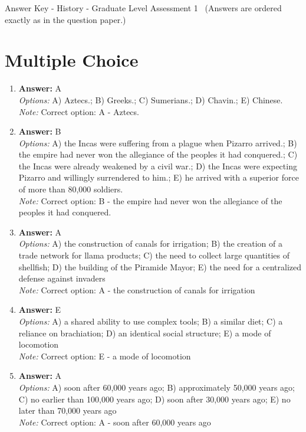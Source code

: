 \documentclass[12pt]{article}
\begin{document}
\begin{center}
Answer Key - History - Graduate Level Assessment 1 \
\small (Answers are ordered exactly as in the question paper.)
\end{center}

\section*{Multiple Choice}
\begin{enumerate}[label=\arabic*.]
\item \textbf{Answer:} A
\\ \textit{Options:} A) Aztecs.; B) Greeks.; C) Sumerians.; D) Chavin.; E) Chinese.
\\ \textit{Note:} Correct option: A - Aztecs.
\item \textbf{Answer:} B
\\ \textit{Options:} A) the Incas were suffering from a plague when Pizarro arrived.; B) the empire had never won the allegiance of the peoples it had conquered.; C) the Incas were already weakened by a civil war.; D) the Incas were expecting Pizarro and willingly surrendered to him.; E) he arrived with a superior force of more than 80,000 soldiers.
\\ \textit{Note:} Correct option: B - the empire had never won the allegiance of the peoples it had conquered.
\item \textbf{Answer:} A
\\ \textit{Options:} A) the construction of canals for irrigation; B) the creation of a trade network for llama products; C) the need to collect large quantities of shellfish; D) the building of the Piramide Mayor; E) the need for a centralized defense against invaders
\\ \textit{Note:} Correct option: A - the construction of canals for irrigation
\item \textbf{Answer:} E
\\ \textit{Options:} A) a shared ability to use complex tools; B) a similar diet; C) a reliance on brachiation; D) an identical social structure; E) a mode of locomotion
\\ \textit{Note:} Correct option: E - a mode of locomotion
\item \textbf{Answer:} A
\\ \textit{Options:} A) soon after 60,000 years ago; B) approximately 50,000 years ago; C) no earlier than 100,000 years ago; D) soon after 30,000 years ago; E) no later than 70,000 years ago
\\ \textit{Note:} Correct option: A - soon after 60,000 years ago
\end{enumerate}
\end{document}
